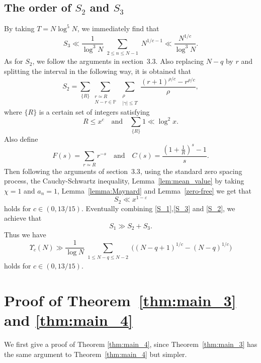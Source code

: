 \documentclass[12pt, reqno, twoside, letterpaper]{amsart}
\numberwithin{equation}{section}
\def\eps{\varepsilon}
\newcommand{\PP}{\ensuremath{\mathbb{P}}}
\theoremstyle{customthm}
\theoremstyle{customrem}
\begin{document}
\subsection{The order of $S_2$ and $S_3$}
By taking $T=N\log ^5N$, we immediately find that
\begin{equation}
	\label{S_3}
S_3\ll \frac{1}{\log ^3N}\sum_{\substack{2\leqslant n \leqslant N-1}} N^{1/c-1}\ll \frac{N^{1/c}}{\log ^3N}.
\end{equation}
As for $S_2$, we follow the arguments in section~$3.3$. Also replacing $N-q$ by $r$ and splitting the interval in the following way, it is obtained that
$$
S_2=\sum_{\{R\}}\sum_{\substack{r\simeq R \\ N-r\in\PP}} \sum_{\substack{\rho \\ |\gamma| \leqslant T}}\frac{(r+1)^{\rho/c}-r^{\rho/c}}{\rho},
$$
where $\{R\}$ is a certain set of integers satisfying
$$
R \leqslant x^c \quad \text{and} \quad \sum_{\{R\}}1 \ll \log^2x.
$$
Also define
$$
F(s)=\sum_{r\simeq R}r^{-s} \quad \text{and} \quad C(s)=\frac{(1+\frac{1}{R})^{s}-1}{s}.
$$
Then following the arguments of section~$3.3$, using the standard zero spacing process, the Cauchy-Schwartz inequality, Lemma~\ref{lem:mean_value} by taking $\chi = 1$ and $a_n = 1$, Lemma~\ref{lemma:Maynard} and Lemma~\ref{zero-free} we get that
\begin{equation}
	\label{S_2}
S_2\ll x^{1-\eps}
\end{equation}
holds for $c\in (0, 13/15)$.
Eventually combining \eqref{S_1},\eqref{S_3} and \eqref{S_2}, we achieve that
$$
S_1\gg S_2+S_3.
$$
Thus we have
\begin{equation*}
\Upsilon_c(N) \gg \frac{1}{\log N}\sum_{\substack{1\leqslant N-q\leqslant N-2 }} \bigg( (N-q+1)^{1/c}-(N-q)^{1/c} \bigg)
\end{equation*}
holds for $c\in (0, 13/15)$.












\section{Proof of Theorem~\ref{thm:main_3} and \ref{thm:main_4}}
We first give a proof of Theorem \ref{thm:main_4}, since Theorem~\ref{thm:main_3} has the same argument to Theorem~\ref{thm:main_4} but simpler.
\end{document}
